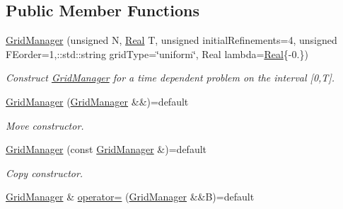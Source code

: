 \subsection*{Public Member Functions}
\begin{DoxyCompactItemize}
\item 
\hyperlink{classSpacy_1_1KaskadeParabolic_1_1GridManager_a74aae5087a0133bf793427d6f7f356c4}{Grid\-Manager} (unsigned N, \hyperlink{classSpacy_1_1Real}{Real} T, unsigned initial\-Refinements=4, unsigned F\-Eorder=1,\-::std\-::string grid\-Type=\char`\"{}uniform\char`\"{}, Real lambda=\hyperlink{classSpacy_1_1Real}{Real}\{-\/0.\})
\begin{DoxyCompactList}\small\item\em Construct \hyperlink{classSpacy_1_1KaskadeParabolic_1_1GridManager}{Grid\-Manager} for a time dependent problem on the interval \mbox{[}0,T\mbox{]}. \end{DoxyCompactList}\item 
\hypertarget{classSpacy_1_1KaskadeParabolic_1_1GridManager_ae2a817d0309a554f4af1107d716b9e21}{\hyperlink{classSpacy_1_1KaskadeParabolic_1_1GridManager_ae2a817d0309a554f4af1107d716b9e21}{Grid\-Manager} (\hyperlink{classSpacy_1_1KaskadeParabolic_1_1GridManager}{Grid\-Manager} \&\&)=default}\label{classSpacy_1_1KaskadeParabolic_1_1GridManager_ae2a817d0309a554f4af1107d716b9e21}

\begin{DoxyCompactList}\small\item\em Move constructor. \end{DoxyCompactList}\item 
\hypertarget{classSpacy_1_1KaskadeParabolic_1_1GridManager_a322c9e902d350fe25581a4cb5fdedcfe}{\hyperlink{classSpacy_1_1KaskadeParabolic_1_1GridManager_a322c9e902d350fe25581a4cb5fdedcfe}{Grid\-Manager} (const \hyperlink{classSpacy_1_1KaskadeParabolic_1_1GridManager}{Grid\-Manager} \&)=default}\label{classSpacy_1_1KaskadeParabolic_1_1GridManager_a322c9e902d350fe25581a4cb5fdedcfe}

\begin{DoxyCompactList}\small\item\em Copy constructor. \end{DoxyCompactList}\item 
\hypertarget{classSpacy_1_1KaskadeParabolic_1_1GridManager_aaf896a7a157980d7ee2465649351d595}{\hyperlink{classSpacy_1_1KaskadeParabolic_1_1GridManager}{Grid\-Manager} \& \hyperlink{classSpacy_1_1KaskadeParabolic_1_1GridManager_aaf896a7a157980d7ee2465649351d595}{operator=} (\hyperlink{classSpacy_1_1KaskadeParabolic_1_1GridManager}{Grid\-Manager} \&\&B)=default}\label{classSpacy_1_1KaskadeParabolic_1_1GridManager_aaf896a7a157980d7ee2465649351d595}


\end{DoxyCompactItemize}
